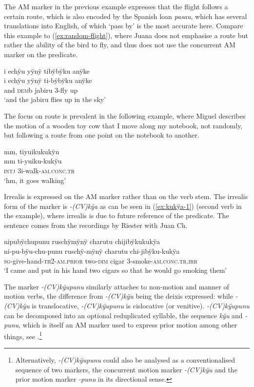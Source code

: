 The AM marker in the previous example expresses that the flight follows a certain route, which is also encoded by the Spanish loan \textit{pasau}, which has several translations into English, of which ‘pass by’ is the most accurate here. Compare this example to (\ref{ex:random-flight}), where Juana does not emphasise a route but rather the ability of the bird to fly, and thus does not use the concurrent AM marker on the predicate.

\ea\label{ex:random-flight}
\begingl 
\glpreamble i echÿu yÿnÿ tibÿbÿku anÿke\\
\gla i echÿu yÿnÿ ti-bÿbÿku anÿke\\ 
\glb and \textsc{dem}b jabiru 3-fly up\\ 
\glft ‘and the jabiru flies up in the sky’
\trailingcitation{[jxx-a120516l-a.253]}%
\xe

The focus on route is prevalent in the following example, where Miguel describes the motion of a wooden toy cow that I move along my notebook, not randomly, but following a route from one point on the notebook to another.

\ea\label{ex:kukÿu-manner-3}
\begingl 
\glpreamble mm, tiyuikukukÿu\\
\gla mm ti-yuiku-kukÿu\\ 
\glb \textsc{intj} 3i-walk-\textsc{am.conc.tr}\\ 
\glft ‘hm, it goes walking’
\trailingcitation{[mox-e110914l-1.150]}
\xe

Irrealis is expressed on the AM marker rather than on the verb stem. The irrealis form of the marker is \textit{-(CV)kÿa} as can be seen in (\ref{ex:kukÿa-1}) (second verb in the example), where irrealis is due to future reference of the predicate. The sentence comes from the recordings by Riester with Juan Ch.

\ea\label{ex:kukÿa-1}
\begingl 
\glpreamble nipubÿchupunu ruschÿmÿnÿ charutu chijibÿkukukÿa\\
\gla ni-pu-bÿu-chu-punu ruschÿ-mÿnÿ charutu chi-jibÿku-kukÿa\\ 
\textsc{sg}-give-hand-\textsc{th}2-\textsc{am.prior} two-\textsc{dim} cigar 3-smoke-\textsc{am.conc.tr.irr}\\ 
\glft ‘I came and put in his hand two cigars so that he would go smoking them’
\trailingcitation{[nxx-p630101g-1.035-036]}
\xe


The marker \textit{-(CV)kÿupunu} similarly attaches to non-motion and  manner of motion verbs, the difference from \textit{-(CV)kÿu} being the deixis expressed: while \textit{-(CV)kÿu} is translocative, \textit{-(CV)kÿupunu} is cislocative (or venitive). \textit{-(CV)kÿupunu} can be decomposed into an optional reduplicated syllable, the sequence \textit{kÿu} and \textit{-punu}, which is itself an AM marker used to express prior motion among other things, see .\footnote{Alternatively, \textit{-(CV)kÿupunu} could also be analysed as a conventionalised sequence of two markers, the concurrent motion marker \textit{-(CV)kÿu} and the prior motion marker \textit{-punu} in its directional sense.} 

